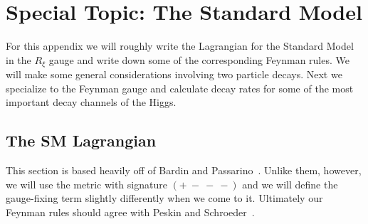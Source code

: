 \chapter{Special Topic: The Standard Model}\label{ap:spec_SM}

For this appendix we will roughly write the Lagrangian for the Standard Model in the
$R_\xi$ gauge and write down some of the corresponding Feynman rules. We will
make some general considerations involving two particle decays. Next we
specialize to the Feynman gauge and calculate decay rates for some of
the most important decay channels of the Higgs. 

\section{The SM Lagrangian}
This section is based heavily off of Bardin and 
Passarino~\cite{bardin_standard_1999}. Unlike
them, however, we will use the metric with signature $(+\ -\ -\ -)$ and we will
define the gauge-fixing term slightly differently when we come to it.
Ultimately our Feynman rules should agree with Peskin and 
Schroeder~\cite{peskin_introduction_1995}.

